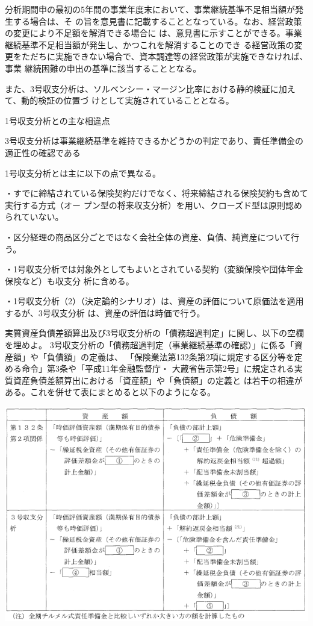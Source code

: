 \documentclass[report,gutter=10mm,fore-edge=10mm,uplatex,dvipdfmx]{jlreq}
\begin{document}
分析期間申の最初の5年間の事業年度末において、事業継続基準不足相当額が発生する場合は、そ
の旨を意見書に記載することとなっている。なお、経営政策の変更により不足額を解消できる場合に
は、意見書に示すことができる。事業継続基準不足相当額が発生し、かつこれを解消することのでき
る経営政策の変更をただちに実施できない場合で、資本調達等の経営政策が実施できなければ、事業
継続困難の申出の基準に該当することとなる。

また、3号収支分析は、ソルベンシー・マージン比率における静的検証に加えて、動的検証の位置づ
けとして実施されていることとなる。

1号収支分析との主な相違点

3号収支分析は事業継続基準を維持できるかどうかの判定であり、責任準備金の適正性の確認である

1号収支分析とは主に以下の点で異なる。

・すでに締結されている保険契約だけでなく、将来締結される保険契約も含めて実行する方式（オー
プン型の将来収支分析）を用い、クローズド型は原則認められていない。

・区分経理の商品区分ごとではなく会社全体の資産、負債、純資産について行う。

・1号収支分析では対象外としてもよいとされている契約（変額保険や団体年金保険など）も収支分
析に含める。

・1号収支分析（2）（決定論的シナリオ）は、資産の評価について原価法を適用するが、3号収支分析
は、資産の評価は時価で行う。


実質資産負債差額算出及び3号収支分析の「債務超過判定」に関し、以下の空欄を埋めよ。
3号収支分析の「債務超過判定（事業継続基準の確認）」に係る「資産額」や「負債額」の定義は、
「保険業法第132条第2項に規定する区分等を定める命令」第3条や「平成11年金融監督庁・
大蔵省告示第2号」に規定される実質資産負債差額算出における「資産額」や「負債額」の定義と
は若干の相違がある。これを併せて表にまとめると以下のようになる。

\includegraphics[scale=0.8]{./images/ProbH19-2-1-2.png}
\end{document}
